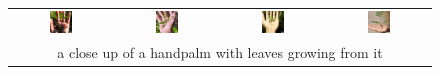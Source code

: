 \begin{figure}[ht!]
\begin{tabular}{cccc}
        \includegraphics[width=0.24\textwidth]{figures/cross/hand_0.jpg} &
        \includegraphics[width=0.24\textwidth]{figures/cross/hand_1.jpg} &
        \includegraphics[width=0.24\textwidth]{figures/cross/hand_2.jpg} &
        \includegraphics[width=0.24\textwidth]{figures/cross/hand_3.jpg} \vspace{-1mm}\\
        \multicolumn{4}{c}{\small a close up of a handpalm with leaves growing from it}\\


\end{tabular}
\end{figure}
